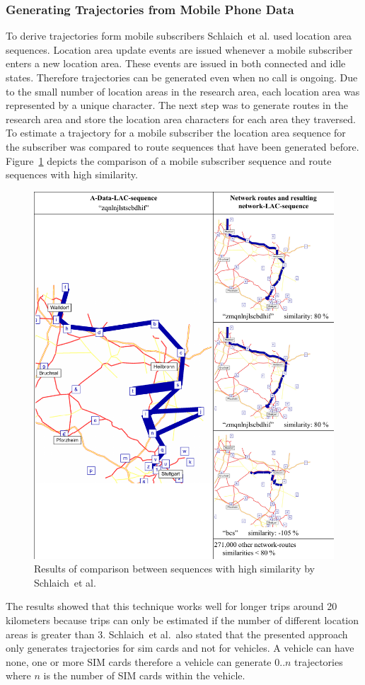 \documentclass[master,english]{hgbthesis}
\begin{document}
\subsubsection{Generating Trajectories from Mobile Phone Data}
To derive trajectories form mobile subscribers Schlaich~et al. \cite{Schlaich2010a} used location area sequences. Location area update events are issued whenever a mobile subscriber enters a new location area. These events are issued in both connected and idle states. Therefore trajectories can be generated even when no call is ongoing. Due to the small number of location areas in the research area, each location area was represented by a unique character. The next step was to generate routes in the research area and store the location area characters for each area they traversed. To estimate a trajectory for a mobile subscriber the location area sequence for the subscriber was compared to route sequences that have been generated before. Figure~\ref{fig:schlaichcomp} depicts the comparison of a mobile subscriber sequence and route sequences with high similarity.
\begin{figure}
\centering
\includegraphics[width=0.7\linewidth]{./images/schlaichcomp}
\caption{Results of comparison between sequences with high similarity by Schlaich~et al.\ \cite{Schlaich2010a}}
\label{fig:schlaichcomp}
\end{figure}
The results showed that this technique works well for longer trips around 20 kilometers because trips can only be estimated if the number of different location areas is greater than 3. Schlaich~et al.\ also stated that the presented approach only generates trajectories for sim cards and not for vehicles. A vehicle can have none, one or more SIM cards therefore a vehicle can generate $0..n$ trajectories where $n$ is the number of SIM cards within the vehicle.
\end{document}
